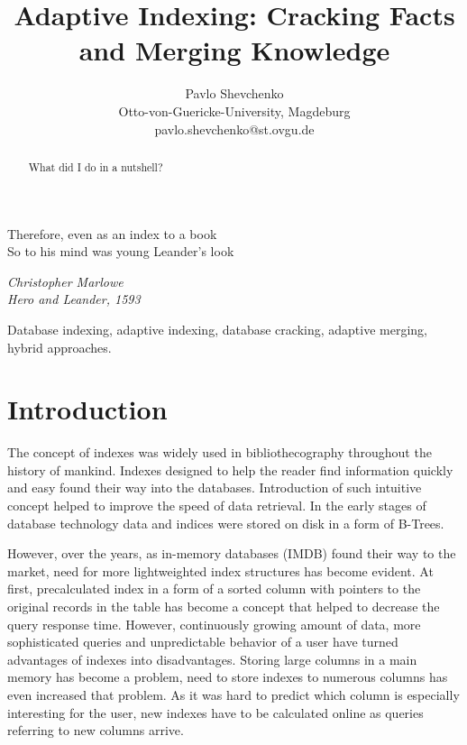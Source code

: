 \documentclass[10pt, conference, compsocconf]{IEEEtran}
\begin{document}
\title{Adaptive Indexing: Cracking Facts and Merging Knowledge}
\author{Pavlo Shevchenko \\ Otto-von-Guericke-University, Magdeburg \\ pavlo.shevchenko@st.ovgu.de}

\maketitle

\epigraph{Therefore, even as an index to a book \\
So to his mind was young Leander's look}{\textit{Christopher Marlowe\\Hero and Leander, 1593}}

\begin{abstract}
What did I do in a nutshell?\\
\end{abstract}

\begin{IEEEkeywords}
Database indexing, adaptive indexing, database cracking, adaptive merging, hybrid approaches.
\end{IEEEkeywords}

\section{Introduction}
The concept of indexes was widely used in bibliothecography throughout the history of mankind. %
Indexes designed to help the reader find information quickly and easy found their way into the databases. Introduction of such intuitive concept helped to improve the speed of data retrieval. In the early stages of database technology data and indices were stored on disk in a form of B-Trees.

However, over the years, as in-memory databases (IMDB) found their way to the market, need for more lightweighted index structures has become evident. At first, precalculated index in a form of a sorted column with pointers to the original records in the table has become a concept that helped to decrease the query response time. However, continuously growing amount of data, more sophisticated queries and unpredictable behavior of a user have turned advantages of indexes into disadvantages. Storing large columns in a main memory has become a problem, need to store indexes to numerous columns has even increased that problem. As it was hard to predict which column is especially interesting for the user, new indexes have to be calculated online as queries referring to new columns arrive.
\end{document}

